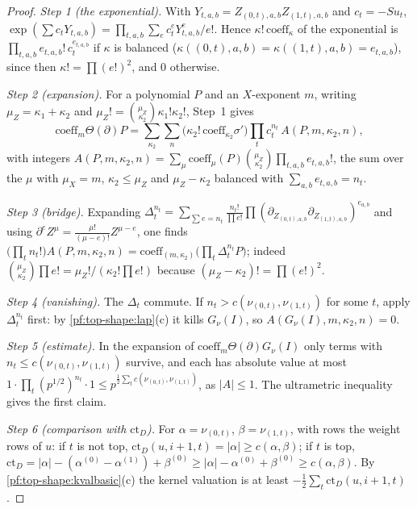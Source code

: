 \begin{proof}
\emph{Step 1 (the exponential).} With $Y_{t,a,b}=Z_{(0,t),a,b}Z_{(1,t),a,b}$ and $c_t=-Su_t$,
$\exp(\sum c_tY_{t,a,b})=\prod_{t,a,b}\sum_ec_t^eY_{t,a,b}^e/e!$. Hence $\kappa!\,\mathrm{coeff}_\kappa$ of the exponential is
$\prod_{t,a,b}e_{t,a,b}!\,c_t^{e_{t,a,b}}$ if $\kappa$ is balanced ($\kappa((0,t),a,b)=\kappa((1,t),a,b)=e_{t,a,b}$), since then
$\kappa!=\prod(e!)^2$, and $0$ otherwise.

\emph{Step 2 (expansion).} For a polynomial $P$ and an $X$-exponent $m$, writing $\mu_Z=\kappa_1+\kappa_2$ and
$\mu_Z!=\binom{\mu_Z}{\kappa_2}\kappa_1!\kappa_2!$, Step~1 gives
\[
\mathrm{coeff}_m\Theta(\partial)P=\sum_{\kappa_2}\sum_n\bigl(\kappa_2!\,\mathrm{coeff}_{\kappa_2}\sigma'\bigr)\prod_tc_t^{n_t}\,
A(P,m,\kappa_2,n),
\]
with integers $A(P,m,\kappa_2,n)=\sum_\mu\mathrm{coeff}_\mu(P)\binom{\mu_Z}{\kappa_2}\prod_{t,a,b}e_{t,a,b}!$, the sum over the $\mu$ with
$\mu_X=m$, $\kappa_2\le\mu_Z$ and $\mu_Z-\kappa_2$ balanced with $\sum_{a,b}e_{t,a,b}=n_t$.

\emph{Step 3 (bridge).} Expanding $\Delta_t^{n_t}=\sum_{\sum e=n_t}\frac{n_t!}{\prod e!}\prod(\partial_{Z_{(0,t),a,b}}
\partial_{Z_{(1,t),a,b}})^{e_{a,b}}$ and using $\partial^eZ^\mu=\frac{\mu!}{(\mu-e)!}Z^{\mu-e}$, one finds
$\bigl(\prod_tn_t!\bigr)A(P,m,\kappa_2,n)=\mathrm{coeff}_{(m,\kappa_2)}\bigl(\prod_t\Delta_t^{n_t}P\bigr)$; indeed
$\binom{\mu_Z}{\kappa_2}\prod e!=\mu_Z!/(\kappa_2!\prod e!)$ because $(\mu_Z-\kappa_2)!=\prod(e!)^2$.

\emph{Step 4 (vanishing).} The $\Delta_t$ commute. If $n_t>c(\nu_{(0,t)},\nu_{(1,t)})$ for some $t$, apply
$\Delta_t^{n_t}$ first: by \cref{pf:top-shape:lap}(c) it kills $G_\nu(I)$, so $A(G_\nu(I),m,\kappa_2,n)=0$.

\emph{Step 5 (estimate).} In the expansion of $\mathrm{coeff}_m\Theta(\partial)G_\nu(I)$ only terms with
$n_t\le c(\nu_{(0,t)},\nu_{(1,t)})$ survive, and each has absolute value at most
$1\cdot\prod_t(p^{1/2})^{n_t}\cdot1\le p^{\frac12\sum_tc(\nu_{(0,t)},\nu_{(1,t)})}$, as $|A|\le1$. The ultrametric inequality
gives the first claim.

\emph{Step 6 (comparison with $\mathrm{ct}_D$).} For $\alpha=\nu_{(0,t)}$, $\beta=\nu_{(1,t)}$, with rows the weight rows of
$u$: if $t$ is not top, $\mathrm{ct}_D(u,i+1,t)=|\alpha|\ge c(\alpha,\beta)$; if $t$ is top,
$\mathrm{ct}_D=|\alpha|-(\alpha^{(0)}-\alpha^{(1)})+\beta^{(0)}\ge|\alpha|-\alpha^{(0)}+\beta^{(0)}\ge c(\alpha,\beta)$. By
\cref{pf:top-shape:kvalbasic}(c) the kernel valuation is at least $-\frac12\sum_t\mathrm{ct}_D(u,i+1,t)$.
\end{proof}

